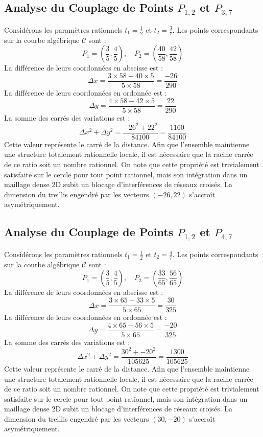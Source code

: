 \documentclass[12pt, a4paper]{article}
\begin{document}
\subsection{Analyse du Couplage de Points $P_{1,2}$ et $P_{3,7}$}
Considérons les paramètres rationnels $t_1 = \frac{1}{2}$ et $t_2 = \frac{3}{7}$.
Les points correspondants sur la courbe algébrique $\mathcal{C}$ sont :
$$ P_1 = \left( \frac{3}{5}, \frac{4}{5} \right), \quad P_2 = \left( \frac{40}{58}, \frac{42}{58} \right) $$
La différence de leurs coordonnées en abscisse est :
$$ \Delta x = \frac{3 \times 58 - 40 \times 5}{5 \times 58} = \frac{-26}{290} $$
La différence de leurs coordonnées en ordonnée est :
$$ \Delta y = \frac{4 \times 58 - 42 \times 5}{5 \times 58} = \frac{22}{290} $$
La somme des carrés des variations est :
$$ \Delta x^2 + \Delta y^2 = \frac{ -26^2 + 22^2 }{ 84100 } = \frac{ 1160 }{ 84100 } $$
Cette valeur représente le carré de la distance. Afin que l'ensemble maintienne une structure totalement rationnelle locale, il est nécessaire que la racine carrée de ce ratio soit un nombre rationnel. On note que cette propriété est trivialement satisfaite sur le cercle pour tout point rationnel, mais son intégration dans un maillage dense 2D subit un blocage d'interférences de réseaux croisés. La dimension du treillis engendré par les vecteurs $( -26, 22 )$ s'accroît asymétriquement.


\subsection{Analyse du Couplage de Points $P_{1,2}$ et $P_{4,7}$}
Considérons les paramètres rationnels $t_1 = \frac{1}{2}$ et $t_2 = \frac{4}{7}$.
Les points correspondants sur la courbe algébrique $\mathcal{C}$ sont :
$$ P_1 = \left( \frac{3}{5}, \frac{4}{5} \right), \quad P_2 = \left( \frac{33}{65}, \frac{56}{65} \right) $$
La différence de leurs coordonnées en abscisse est :
$$ \Delta x = \frac{3 \times 65 - 33 \times 5}{5 \times 65} = \frac{30}{325} $$
La différence de leurs coordonnées en ordonnée est :
$$ \Delta y = \frac{4 \times 65 - 56 \times 5}{5 \times 65} = \frac{-20}{325} $$
La somme des carrés des variations est :
$$ \Delta x^2 + \Delta y^2 = \frac{ 30^2 + -20^2 }{ 105625 } = \frac{ 1300 }{ 105625 } $$
Cette valeur représente le carré de la distance. Afin que l'ensemble maintienne une structure totalement rationnelle locale, il est nécessaire que la racine carrée de ce ratio soit un nombre rationnel. On note que cette propriété est trivialement satisfaite sur le cercle pour tout point rationnel, mais son intégration dans un maillage dense 2D subit un blocage d'interférences de réseaux croisés. La dimension du treillis engendré par les vecteurs $( 30, -20 )$ s'accroît asymétriquement.
\end{document}
